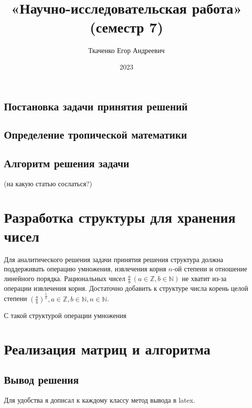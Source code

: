 \documentclass[specialist, substylefile = spbureport.rtx,
    subf,href,colorlinks=true, 12pt]{disser}
\title{«Научно-исследовательская работа» (семестр 7)}
\author{Ткаченко Егор Андреевич}
\date{2023}
\begin{document}
    \maketitle
    \pagebreak
    \tableofcontents
    \pagebreak

    \intro

    \section{Постановка задачи принятия решений}

    \section{Определение тропической математики}
    \section{Алгоритм решения задачи}
    (на какую статью сослаться?)


       
    \chapter{Разработка структуры для хранения чисел}

    Для аналитического решения задачи принятия решения структура должна поддерживать операцию умножения, извлечения корня $n$-ой степени и отношение линейного порядка.
    Рациональных чисел $\displaystyle \frac{a}{b} \, (a \in \mathbb{Z}, b \in \mathbb{N})$ не хватит из-за операции извлечения корня. 
    Достаточно добавить к структуре числа корень целой степени  $(\frac{a}{b})^{\frac{1}{n}}, a \in \mathbb{Z}, b \in \mathbb{N}, n \in \mathbb{N}$.

    С такой структурой операции умножения 


    \chapter{Реализация матриц и алгоритма}

    \section{Вывод решения}
    Для удобства я дописал к каждому классу метод вывода в latex. 
    

    \section{}
\end{document}

